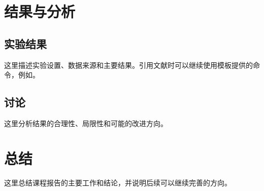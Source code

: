 \documentclass[course]{thesis-uestc}
\begin{document}
\chapter{结果与分析}

\section{实验结果}

这里描述实验设置、数据来源和主要结果。引用文献时可以继续使用模板提供的命令，例如。

\section{讨论}

这里分析结果的合理性、局限性和可能的改进方向。

\chapter{总结}

这里总结课程报告的主要工作和结论，并说明后续可以继续完善的方向。


\end{document}
